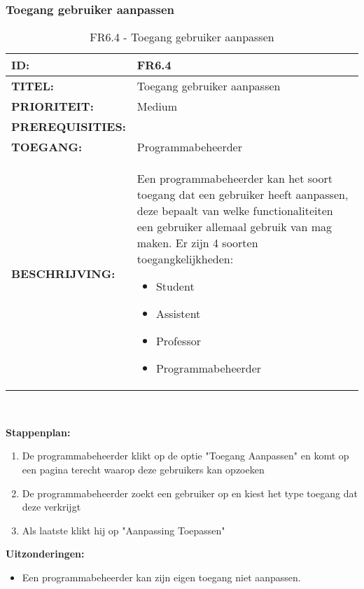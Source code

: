 \subsubsection{Toegang gebruiker aanpassen }
\noindent\begin{table}[H]
            \begin{tabular}{l | p{10cm}}
                \textbf{ID:} & FR6.4 \\ \hline
                \textbf{TITEL:} & Toegang gebruiker aanpassen \\ \hline
                \textbf{PRIORITEIT:} &  Medium \\ \hline
                \textbf{PREREQUISITIES:} & \\ \hline
                \textbf{TOEGANG:} & Programmabeheerder \\ \hline
                \textbf{BESCHRIJVING:} & Een programmabeheerder kan het soort toegang dat een gebruiker heeft aanpassen, deze bepaalt van welke functionaliteiten een gebruiker allemaal gebruik van mag maken. Er zijn 4 soorten toegangkelijkheden: 
                \begin{itemize}
                		\item Student
                		\item Assistent
                		\item Professor
                		\item Programmabeheerder
                \end{itemize}
            \end{tabular}\\
            \caption{FR6.4 - Toegang gebruiker aanpassen }
            \label{tab:FR6.4 - Toegang gebruiker aanpassen }
        \end{table}   

\textbf{Stappenplan:}
	\begin{enumerate}
	\item De programmabeheerder klikt op de optie "Toegang Aanpassen" en komt op een pagina terecht waarop deze gebruikers kan opzoeken
	\item De programmabeheerder zoekt een gebruiker op en kiest het type toegang dat deze verkrijgt
	\item Als laatste klikt hij op "Aanpassing Toepassen"
	\end{enumerate}	
	
\textbf{Uitzonderingen:}
\begin{itemize}
\item Een programmabeheerder kan zijn eigen toegang niet aanpassen.
\end{itemize}

\clearpage